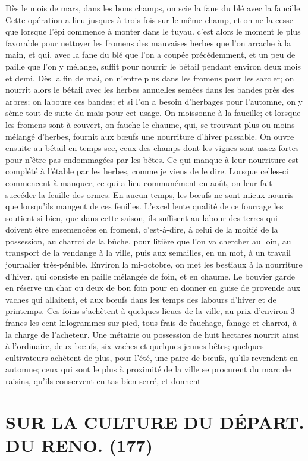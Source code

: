 Dès le mois de mars, dans les bons champs, on scie la fane du blé avec la faucille. Cette opération a lieu jusques à trois fois sur le même champ, et on ne la cesse que lorsque l'épi commence à monter dans le tuyau.\setcounter{page}{175} c'est alors le moment le plus favorable pour nettoyer les fromens des mauvaises herbes que l'on arrache à la main, et qui, avec la fane du blé que l'on a coupée précédemment, et un peu de paille que l'on y mélange, suffit pour nourrir le bétail pendant environ deux mois et demi.
Dès la fin de mai, on n'entre plus dans les fromens pour les sarcler; on nourrit alors le bétail avec les herbes annuelles semées dans les bandes près des arbres; on laboure ces bandes; et si l'on a besoin d'herbages pour l'automne, on y sème tout de suite du maïs pour cet usage.
On moissonne à la faucille; et lorsque les fromens sont à couvert, on fauche le chaume, qui, se trouvant plus ou moins mélangé d'herbes, fournit aux bœufs une nourriture d'hiver passable. On ouvre ensuite au bétail en temps sec, ceux des champs dont les vignes sont assez fortes pour n'être pas endommagées par les bêtes. Ce qui manque à leur nourriture est complété à l'étable par les herbes, comme je viens de le dire. Lorsque celles-ci commencent à manquer, ce qui a lieu communément en août, on leur fait succéder la feuille des ormes. En aucun temps, les bœufs ne sont mieux nourris que lorsqu'ils mangent de ces feuilles. L'excel\setcounter{page}{176} lente qualité de ce fourrage les soutient si bien, que dans cette saison, ils suffisent au labour des terres qui doivent être ensemencées en froment, c'est-à-dire, à celui de la moitié de la possession, au charroi de la bûche, pour litière que l'on va chercher au loin, au transport de la vendange à la ville, puis aux semailles, en un mot, à un travail journalier très-pénible.
Environ la mi-octobre, on met les bestiaux à la nourriture d'hiver, qui consiste en paille mélangée de foin, et en chaume. Le bouvier garde en réserve un char ou deux de bon foin pour en donner en guise de provende aux vaches qui allaitent, et aux bœufs dans les temps des labours d'hiver et de printemps.
Ces foins s'achètent à quelques lieues de la ville, au prix d'environ 3 francs les cent kilogrammes sur pied, tous frais de fauchage, fanage et charroi, à la charge de l'acheteur.
Une métairie ou possession de huit hectares nourrit ainsi à l'ordinaire, deux bœufs, six vaches et quelques jeunes bêtes; quelques cultivateurs achètent de plus, pour l'été, une paire de bœufs, qu'ils revendent en automne; ceux qui sont le plus à proximité de la ville se procurent du marc de raisins, qu'ils conservent en tas bien serré, et donnent\setcounter{page}{177} \section{SUR LA CULTURE DU DÉPART. DU RENO. (177)}
